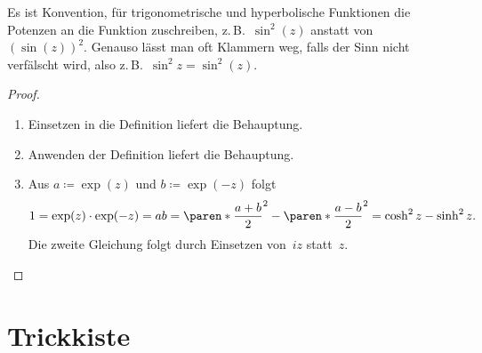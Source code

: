 \documentclass[a4paper]{article}
\begin{document}
\begin{notation}
    Es ist Konvention, für trigonometrische und hyperbolische Funktionen die Potenzen an die Funktion zuschreiben, z.\,B.\ $\sin^2(z)$ anstatt von~$(\sin(z))^2$. Genauso lässt man oft Klammern weg, falls der Sinn nicht verfälscht wird, also z.\,B.\ $\sin^2 z = \sin^2(z)$.
\end{notation}

\begin{proof}\leavevmode
    \begin{enumerate}
        \item Einsetzen in die Definition liefert die Behauptung.
        \item Anwenden der Definition liefert die Behauptung.
        \item Aus $a \coloneqq \exp(z)$ und $b \coloneqq \exp(-z)$ folgt
        \begin{equation*}
            1 = \exp(z)\cdot\exp(-z) = ab = \paren*{\frac{a+b}{2}}^2 - \paren*{\frac{a-b}{2}}^2 = \cosh^2z-\sinh^2z.
        \end{equation*}
        Die zweite Gleichung folgt durch Einsetzen von~$iz$ statt~$z$.\qedhere
    \end{enumerate}
\end{proof}


\newpage\appendix

\section{Trickkiste}
\end{document}
